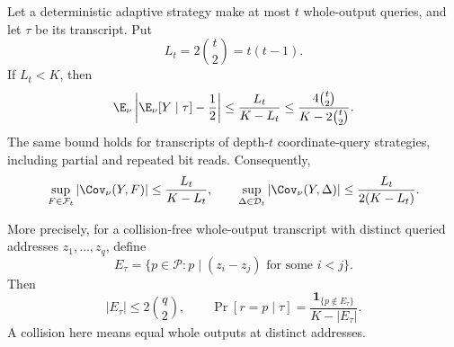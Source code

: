 \begin{lemma}\label{ian:period-hsp-adaptive-hiding}
Let a deterministic adaptive strategy make at most \(t\) whole-output queries, and let \(\tau\) be its transcript. Put
\[
 L_t=2\binom t2=t(t-1).
\]
If \(L_t<K\), then
\[
 \E_\nu\left|\E_\nu[Y\mid\tau]-\frac12\right|
 \le\frac{L_t}{K-L_t}
 \le
 \frac{4\binom t2}{K-2\binom t2}.
\]
The same bound holds for transcripts of depth-\(t\) coordinate-query strategies, including partial and repeated bit reads. Consequently,
\[
 \sup_{F\in\mathcal F_t}|\Cov_\nu(Y,F)|
 \le\frac{L_t}{K-L_t},
 \qquad
 \sup_{\Delta\in\mathcal D_t}|\Cov_\nu(Y,\Delta)|
 \le\frac{L_t}{2(K-L_t)}.
\]

More precisely, for a collision-free whole-output transcript with distinct queried addresses \(z_1,\ldots,z_q\), define
\[
 E_\tau=
 \{p\in\mathcal P:
       p\mid(z_i-z_j)\text{ for some }i<j\}.
\]
Then
\[
 |E_\tau|\le2\binom q2,
 \qquad
 \Pr[r=p\mid\tau]
 =
 \frac{\mathbf1_{\{p\notin E_\tau\}}}{K-|E_\tau|}.
\]
A collision here means equal whole outputs at distinct addresses.
\end{lemma}

